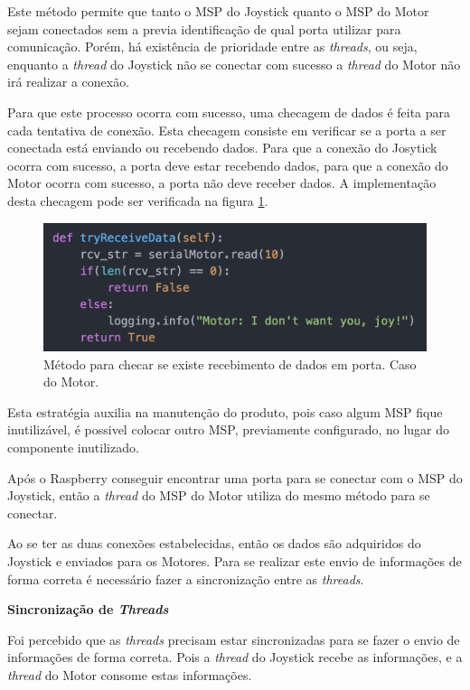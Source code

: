   Este método permite que tanto o MSP do Joystick quanto o MSP do Motor sejam conectados sem a previa identificação de qual porta utilizar para comunicação. Porém, há existência de prioridade entre as \textit{threads}, ou seja, enquanto a \textit{thread} do Joystick não se conectar com sucesso a \textit{thread} do Motor não irá realizar a conexão.

  Para que este processo ocorra com sucesso, uma checagem de dados é feita para cada tentativa de conexão. Esta checagem consiste em verificar se a porta a ser conectada está enviando ou recebendo dados. Para que a conexão do Josytick ocorra com sucesso, a porta deve estar recebendo dados, para que a conexão do Motor ocorra com sucesso, a porta não deve receber dados. A implementação desta checagem pode ser verificada na figura \ref{fig:try_receive_data}.

  \begin{figure}[!htb]
  \centering
  \includegraphics[keepaspectratio=true,scale=0.5]{figuras/resultados/try_receive_data}
  \caption{Método para checar se existe recebimento de dados em porta. Caso do Motor.}
  \label{fig:try_receive_data}
  \end{figure}

  Esta estratégia auxilia na manutenção do produto, pois caso algum MSP fique inutilizável, é possivel colocar outro MSP, previamente configurado, no lugar do componente inutilizado.

  Após o Raspberry conseguir encontrar uma porta para se conectar com o MSP do Joystick, então a \textit{thread} do MSP do Motor utiliza do mesmo método para se conectar.

  Ao se ter as duas conexões estabelecidas, então os dados são adquiridos do Joystick e enviados para os Motores. Para se realizar este envio de informações de forma correta é necessário fazer a sincronização entre as \textit{threads}.

  \textbf{Sincronização de \textit{Threads}}

  Foi percebido que as \textit{threads} precisam estar sincronizadas para se fazer o envio de informações de forma correta. Pois a \textit{thread} do Joystick recebe as informações, e a \textit{thread} do Motor consome estas informações.

